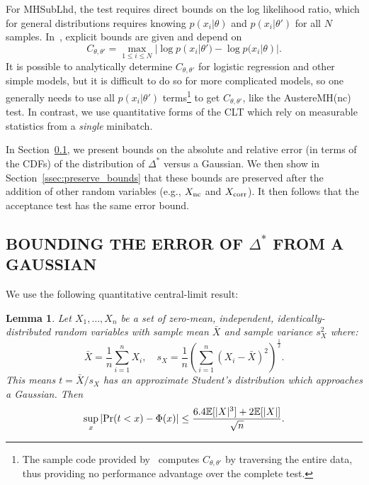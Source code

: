 \documentclass[letterpaper]{article}
\newcommand{\mE}{\mathbb{E}}
\newtheorem{lemma}{Lemma}
\begin{document}
For {\sc MHSubLhd}, the test requires direct bounds on the log likelihood ratio,
which for general distributions requires knowing $p(x_i | \theta)$ and $p(x_i |
\theta')$ for all $N$ samples. In~\citep{icml2014c1_bardenet14}, explicit bounds
are given and depend on
\begin{equation}\label{eq:bad_bound}
    C_{\theta, \theta'} = \max_{1\leq i\leq N}|\log p(x_i | \theta') - \log p(x_i | \theta)|.
\end{equation}
It is possible to analytically determine $C_{\theta,\theta'}$ for logistic
regression and other simple models, but it is difficult to do so for more
complicated models, so one generally needs to use all $p(x_i | \theta')$
terms\footnote{The sample code provided by~\citep{icml2014c1_bardenet14}
computes $C_{\theta,\theta'}$ by traversing the entire data, thus providing no
performance advantage over the complete test.} to get $C_{\theta,\theta'}$, like
the {\sc AustereMH(nc)} test.  In contrast, we use quantitative forms of the CLT
which rely on measurable statistics from a \emph{single} minibatch.

In Section~\ref{ssec:delta_star_distribution}, we present bounds on the absolute
and relative error (in terms of the CDFs) of the distribution of $\Delta^*$
versus a Gaussian. We then show in Section~\ref{ssec:preserve_bounds} that these
bounds are preserved after the addition of other random variables (e.g., $X_{\rm
nc}$ and $X_{\rm corr}$). It then follows that the acceptance test has the same
error bound.

\subsection{BOUNDING THE ERROR OF $\Delta^*$ FROM A GAUSSIAN}\label{ssec:delta_star_distribution}

We use the following quantitative central-limit result:
  
\begin{lemma}\label{lem:quant_clt}
Let $X_1,\ldots,X_n$ be a set of zero-mean, independent, identically-distributed
random variables with sample mean $\bar{X}$ and sample variance $s^2_X$
where:
\begin{equation}
    \bar{X} = \frac{1}{n}\sum_{i=1}^nX_i, \quad s_X = \frac{1}{n}\left(\sum_{i=1}^n(X_i-\bar{X})^2\right)^{\frac{1}{2}}.
\end{equation}
This means $t=\bar{X}/s_X$ has an approximate Student's distribution
which approaches a Gaussian. Then
\begin{equation}\label{eq:clt-bounds}
    \sup_x|{\rm Pr}(t<x) - \Phi(x)| \leq \frac{6.4\mE[|X|^3]+2\mE[|X|]}{\sqrt{n}}.
\end{equation}
\end{lemma}
\end{document}
